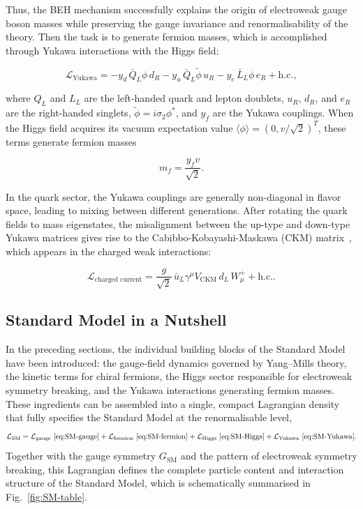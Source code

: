 Thus, the BEH mechanism successfully explains the origin of electroweak gauge boson masses while preserving the gauge invariance and renormalisability of the theory.
Then the task is to generate fermion masses, which is accomplished through Yukawa interactions with the Higgs field:

\begin{equation}
\mathcal{L}_\text{Yukawa} = - y_d \, \bar{Q}_L \phi \, d_R
                - y_u \, \bar{Q}_L \tilde{\phi} \, u_R
                - y_e \, \bar{L}_L \phi \, e_R
                + \text{h.c.},
\end{equation}\label{eq:SM-Yukawa}

where $Q_L$ and $L_L$ are the left-handed quark and lepton doublets, $u_R$, $d_R$, and $e_R$ are the right-handed singlets, 
$\tilde{\phi} = i\sigma_2 \phi^*$, and $y_f$ are the Yukawa couplings. 
When the Higgs field acquires its vacuum expectation value $\langle \phi \rangle = (0, v/\sqrt{2})^T$, these terms generate fermion masses

\begin{equation}
m_f = \frac{y_f v}{\sqrt{2}}.
\end{equation}

In the quark sector, the Yukawa couplings are generally non-diagonal in flavor space, leading to mixing between different generations. 
After rotating the quark fields to mass eigenstates, the misalignment between the up-type and down-type Yukawa matrices gives rise to the Cabibbo-Kobayashi-Maskawa (CKM) matrix~\cite{Cabibbo1963,KobayashiMaskawa1973}, 
which appears in the charged weak interactions:

\begin{equation}
\mathcal{L}_\text{charged current} = \frac{g}{\sqrt{2}} \, \bar{u}_L \gamma^\mu V_{\mathrm{CKM}} \, d_L \, W_\mu^+ + \text{h.c.}.
\end{equation}

\subsection{Standard Model in a Nutshell}
\label{subsec:full-lagrangian}

In the preceding sections, the individual building blocks of the Standard Model have been introduced:
the gauge-field dynamics governed by Yang--Mills theory,
the kinetic terms for chiral fermions,
the Higgs sector responsible for electroweak symmetry breaking,
and the Yukawa interactions generating fermion masses.
These ingredients can be assembled into a single, compact Lagrangian density that fully specifies the Standard Model at the renormalisable level,
\begin{equation}
\mathcal{L}_{\mathrm{SM}}
= \mathcal{L}_{\mathrm{gauge}}~\eqref{eq:SM-gauge}
+ \mathcal{L}_{\mathrm{fermion}}~\eqref{eq:SM-fermion}
+ \mathcal{L}_{\mathrm{Higgs}}~\eqref{eq:SM-Higgs}
+ \mathcal{L}_{\mathrm{Yukawa}}~\eqref{eq:SM-Yukawa}.
\end{equation}
Together with the gauge symmetry $G_{\mathrm{SM}}$ and the pattern of electroweak symmetry breaking,
this Lagrangian defines the complete particle content and interaction structure of the Standard Model,
which is schematically summarised in Fig.~\ref{fig:SM-table}.

